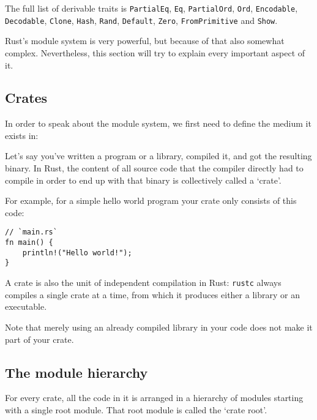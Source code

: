 \documentclass[]{article}
\begin{document}
The full list of derivable traits is \texttt{PartialEq}, \texttt{Eq},
\texttt{PartialOrd}, \texttt{Ord}, \texttt{Encodable},
\texttt{Decodable}, \texttt{Clone}, \texttt{Hash}, \texttt{Rand},
\texttt{Default}, \texttt{Zero}, \texttt{FromPrimitive} and
\texttt{Show}.


Rust's module system is very powerful, but because of that also somewhat
complex. Nevertheless, this section will try to explain every important
aspect of it.

\subsection{Crates}\label{crates}

In order to speak about the module system, we first need to define the
medium it exists in:

Let's say you've written a program or a library, compiled it, and got
the resulting binary. In Rust, the content of all source code that the
compiler directly had to compile in order to end up with that binary is
collectively called a `crate'.

For example, for a simple hello world program your crate only consists
of this code:

\begin{verbatim}
// `main.rs`
fn main() {
    println!("Hello world!");
}
\end{verbatim}

A crate is also the unit of independent compilation in Rust:
\texttt{rustc} always compiles a single crate at a time, from which it
produces either a library or an executable.

Note that merely using an already compiled library in your code does not
make it part of your crate.

\subsection{The module hierarchy}\label{the-module-hierarchy}

For every crate, all the code in it is arranged in a hierarchy of
modules starting with a single root module. That root module is called
the `crate root'.
\end{document}
